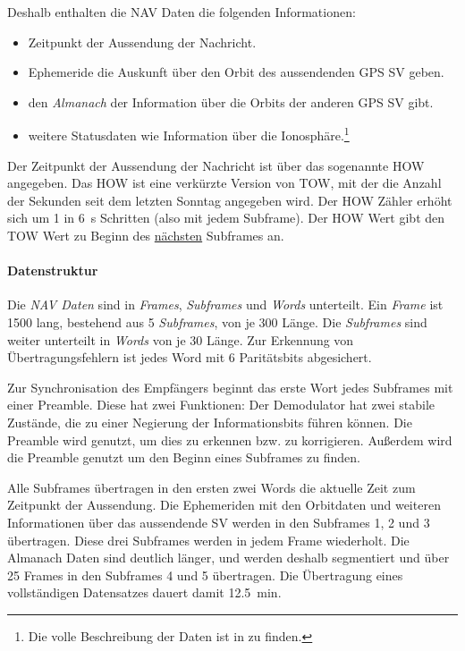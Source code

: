 Deshalb enthalten die NAV Daten die folgenden Informationen:
\begin{itemize}
\item Zeitpunkt der Aussendung der Nachricht.
\item Ephemeride die Auskunft über den Orbit des aussendenden GPS \gls{SV} geben.
\item den \emph{Almanach} der Information über die Orbits der anderen GPS \gls{SV} gibt.
\item weitere Statusdaten wie Information über die Ionosphäre.\footnote{Die volle Beschreibung der Daten ist in \cite{specification2010gps} zu finden.}
\end{itemize}

Der Zeitpunkt der Aussendung der Nachricht ist über das sogenannte \gls{HOW} angegeben. Das \gls{HOW} ist eine verkürzte Version von \gls{TOW}, mit der die Anzahl der Sekunden seit dem letzten Sonntag angegeben wird. Der \gls{HOW} Zähler erhöht sich um 1 in \SI{6}{\second} Schritten (also mit jedem Subframe). Der HOW Wert gibt den TOW Wert zu Beginn des \underline{nächsten} Subframes an.

\paragraph{Datenstruktur}
Die \emph{NAV Daten} sind in \emph{Frames}, \emph{Subframes} und \emph{Words} unterteilt. Ein \emph{Frame} ist \SI{1500}{\bit} lang, bestehend aus 5 \emph{Subframes}, von je \SI{300}{\bit} Länge. Die \emph{Subframes} sind weiter unterteilt in \emph{Words} von je \SI{30}{\bit} Länge. Zur Erkennung von Übertragungsfehlern ist jedes Word mit 6 Paritätsbits abgesichert. 


Zur Synchronisation des Empfängers beginnt das erste Wort jedes Subframes mit einer Preamble. Diese hat zwei Funktionen: Der Demodulator hat zwei stabile Zustände, die zu einer Negierung der Informationsbits führen können. Die Preamble wird genutzt, um dies zu erkennen bzw. zu korrigieren. Außerdem wird die Preamble genutzt um den Beginn eines Subframes zu finden.

Alle Subframes übertragen in den ersten zwei Words die aktuelle Zeit zum Zeitpunkt der Aussendung. Die Ephemeriden mit den Orbitdaten und weiteren Informationen über das aussendende \gls{SV} werden in den Subframes 1, 2 und 3 übertragen. Diese drei Subframes werden in jedem Frame wiederholt. Die Almanach Daten sind deutlich länger, und werden deshalb segmentiert und über 25 Frames in den Subframes 4 und 5 übertragen. Die Übertragung eines vollständigen Datensatzes dauert damit \SI{12.5}{\minute}.

